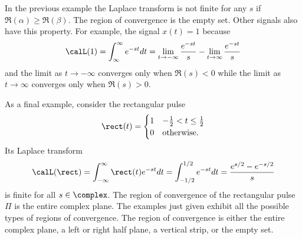 In the previous example the Laplace transform is not finite for any $s$ if $\Re(\alpha) \geq \Re(\beta)$.  The region of convergence is the empty set.  Other signals also have this property.  For example, the signal $x(t) = 1$ because
\[
\calL(1) = \int_{\infty}^\infty e^{-s t} dt = \lim_{t\to -\infty} \frac{e^{-st}}{s} -  \lim_{t\to \infty} \frac{e^{-st}}{s}
\] 
and the limit as $t\to-\infty$ converges only when $\Re(s) < 0$ while the limit as $t \to \infty$ converges only when $\Re(s) > 0$.  %

As a final example, consider the rectangular pulse
\[
\rect(t) = \begin{cases}
1 & -\tfrac{1}{2} < t \leq \tfrac{1}{2} \\
0 & \text{otherwise}.
\end{cases}
\]
Its Laplace transform
\begin{equation}\label{eq:rectLaplace}
\calL(\rect) = \int_{-\infty}^{\infty} \rect(t) e^{-st} dt = \int_{-1/2}^{1/2} e^{-st} dt = \frac{ e^{s/2} - e^{-s/2}}{s}
\end{equation}
is finite for all $s \in \complex$.  The region of convergence of the rectangular pulse $\Pi$ is the entire complex plane.  The examples just given exhibit all the possible types of regions of convergence.  The region of convergence is either the entire complex plane, a left or right half plane, a vertical strip, or the empty set.
 

